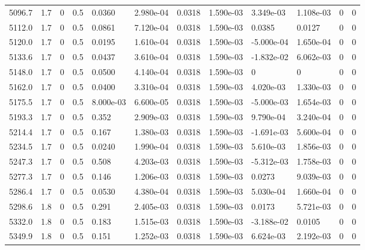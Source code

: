 \documentclass[preview]{standalone}
\begin{document}
{{{{{{{{{{\begin{tabular}{L{1.2cm}C{1.2cm} C{0.3cm}C{0.5cm} C{1.4cm}C{1.4cm} C{1.4cm}C{1.4cm} C{1.6cm}C{1.6cm} C{1.6cm}C{1.6cm}}
  5096.7  &   1.7  & 0     & 0.5 &  0.0360  & 2.980e-04  &  0.0318&   1.590e-03& 3.349e-03 & 1.108e-03   &  0 & 0  \\ 
  5112.0  &   1.7  & 0     & 0.5 &  0.0861  & 7.120e-04  &  0.0318&   1.590e-03& 0.0385 & 0.0127   &  0 & 0  \\ 
  5120.0  &   1.7  & 0     & 0.5 &  0.0195  & 1.610e-04  &  0.0318&   1.590e-03& -5.000e-04 & 1.650e-04   &  0 & 0  \\ 
  5133.6  &   1.7  & 0     & 0.5 &  0.0437  & 3.610e-04  &  0.0318&   1.590e-03& -1.832e-02 & 6.062e-03   &  0 & 0  \\ 
  5148.0  &   1.7  & 0     & 0.5 &  0.0500  & 4.140e-04  &  0.0318&   1.590e-03& 0 & 0   &  0 & 0  \\ 
  5162.0  &   1.7  & 0     & 0.5 &  0.0400  & 3.310e-04  &  0.0318&   1.590e-03& 4.020e-03 & 1.330e-03   &  0 & 0  \\ 
  5175.5  &   1.7  & 0     & 0.5 &  8.000e-03  & 6.600e-05  &  0.0318&   1.590e-03& -5.000e-03 & 1.654e-03   &  0 & 0  \\ 
  5193.3  &   1.7  & 0     & 0.5 &  0.352  & 2.909e-03  &  0.0318&   1.590e-03& 9.790e-04 & 3.240e-04   &  0 & 0  \\ 
  5214.4  &   1.7  & 0     & 0.5 &  0.167  & 1.380e-03  &  0.0318&   1.590e-03& -1.691e-03 & 5.600e-04   &  0 & 0  \\ 
  5234.5  &   1.7  & 0     & 0.5 &  0.0240  & 1.990e-04  &  0.0318&   1.590e-03& 5.610e-03 & 1.856e-03   &  0 & 0  \\ 
  5247.3  &   1.7  & 0     & 0.5 &  0.508  & 4.203e-03  &  0.0318&   1.590e-03& -5.312e-03 & 1.758e-03   &  0 & 0  \\ 
  5277.3  &   1.7  & 0     & 0.5 &  0.146  & 1.206e-03  &  0.0318&   1.590e-03& 0.0273 & 9.039e-03   &  0 & 0  \\ 
  5286.4  &   1.7  & 0     & 0.5 &  0.0530  & 4.380e-04  &  0.0318&   1.590e-03& 5.030e-04 & 1.660e-04   &  0 & 0  \\ 
  5298.6  &   1.8  & 0     & 0.5 &  0.291  & 2.405e-03  &  0.0318&   1.590e-03& 0.0173 & 5.721e-03   &  0 & 0  \\ 
  5332.0  &   1.8  & 0     & 0.5 &  0.183  & 1.515e-03  &  0.0318&   1.590e-03& -3.188e-02 & 0.0105   &  0 & 0  \\ 
  5349.9  &   1.8  & 0     & 0.5 &  0.151  & 1.252e-03  &  0.0318&   1.590e-03& 6.624e-03 & 2.192e-03   &  0 & 0  \\ 
\hline 
\end{tabular} 

}}}}}}}}}}
\end{document}
